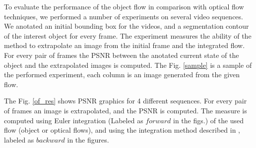 To evaluate the performance of the object flow in comparison with optical flow techniques, we performed 
a number of experiments on several video sequences. We anotated an initial bounding box for the videos, 
and a segmentation contour of the interest object for every frame. The experiment measures the ability of the method to 
extrapolate an image from the initial frame and the integrated flow. For every pair of frames the PSNR between the anotated
current state of the object and the extrapolated images is computed. The Fig. \ref{sample} is a sample of the performed experiment, each column is an image generated from the given flow.

The Fig. \ref{of_res} shows PSNR graphics for 4 different sequences. For every pair of frames an image is extrapolated, and the PSNR is computed.
The measure is computed using Euler integration (Labeled as $forward$ in the figs.) of the used flow (object or optical flows), 
and using the integration method described in \cite{c20}, labeled as $backward$ in the figures.

